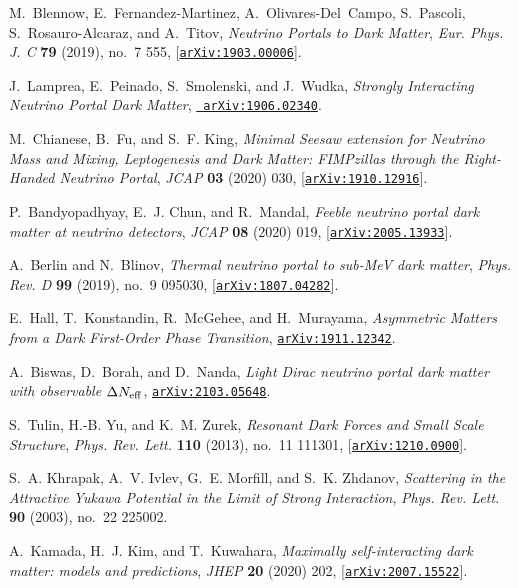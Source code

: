 \documentclass[prd,nofootinbib,preprint,superscriptaddress]{revtex4}
\begin{document}
\begin{thebibliography}{100}
M.~Blennow, E.~Fernandez-Martinez, A.~Olivares-Del~Campo, S.~Pascoli,
  S.~Rosauro-Alcaraz, and A.~Titov, {\it {Neutrino Portals to Dark Matter}},
  {\em Eur. Phys. J. C} {\bf 79} (2019), no.~7 555,
  [\href{http://arxiv.org/abs/1903.00006}{{\tt arXiv:1903.00006}}].

J.~Lamprea, E.~Peinado, S.~Smolenski, and J.~Wudka, {\it {Strongly Interacting
  Neutrino Portal Dark Matter}},  \href{http://arxiv.org/abs/1906.02340}{{\tt
  arXiv:1906.02340}}.

M.~Chianese, B.~Fu, and S.~F. King, {\it {Minimal Seesaw extension for Neutrino
  Mass and Mixing, Leptogenesis and Dark Matter: FIMPzillas through the
  Right-Handed Neutrino Portal}},  {\em JCAP} {\bf 03} (2020) 030,
  [\href{http://arxiv.org/abs/1910.12916}{{\tt arXiv:1910.12916}}].

P.~Bandyopadhyay, E.~J. Chun, and R.~Mandal, {\it {Feeble neutrino portal dark
  matter at neutrino detectors}},  {\em JCAP} {\bf 08} (2020) 019,
  [\href{http://arxiv.org/abs/2005.13933}{{\tt arXiv:2005.13933}}].

A.~Berlin and N.~Blinov, {\it {Thermal neutrino portal to sub-MeV dark
  matter}},  {\em Phys. Rev. D} {\bf 99} (2019), no.~9 095030,
  [\href{http://arxiv.org/abs/1807.04282}{{\tt arXiv:1807.04282}}].

E.~Hall, T.~Konstandin, R.~McGehee, and H.~Murayama, {\it {Asymmetric Matters
  from a Dark First-Order Phase Transition}},
  \href{http://arxiv.org/abs/1911.12342}{{\tt arXiv:1911.12342}}.

A.~Biswas, D.~Borah, and D.~Nanda, {\it {Light Dirac neutrino portal dark
  matter with observable $\Delta{N_{\rm eff}}$}},
  \href{http://arxiv.org/abs/2103.05648}{{\tt arXiv:2103.05648}}.

S.~Tulin, H.-B. Yu, and K.~M. Zurek, {\it {Resonant Dark Forces and Small Scale
  Structure}},  {\em Phys. Rev. Lett.} {\bf 110} (2013), no.~11 111301,
  [\href{http://arxiv.org/abs/1210.0900}{{\tt arXiv:1210.0900}}].

S.~A. Khrapak, A.~V. Ivlev, G.~E. Morfill, and S.~K. Zhdanov, {\it {Scattering
  in the Attractive Yukawa Potential in the Limit of Strong Interaction}},
  {\em Phys. Rev. Lett.} {\bf 90} (2003), no.~22 225002.

A.~Kamada, H.~J. Kim, and T.~Kuwahara, {\it {Maximally self-interacting dark
  matter: models and predictions}},  {\em JHEP} {\bf 20} (2020) 202,
  [\href{http://arxiv.org/abs/2007.15522}{{\tt arXiv:2007.15522}}].


\end{thebibliography}
\end{document}
